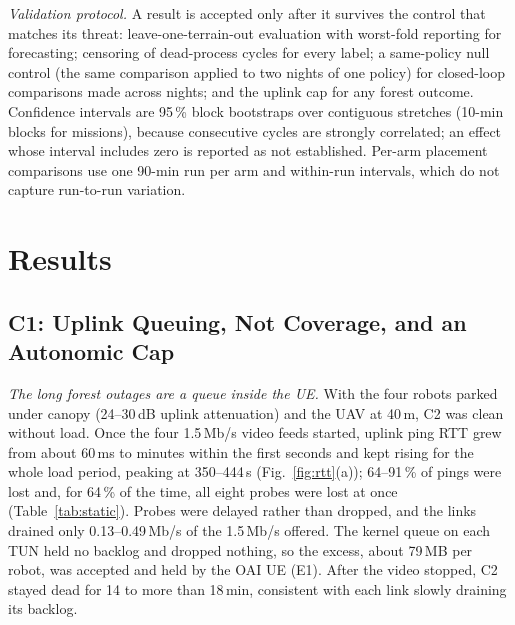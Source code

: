 \begin{table}[t]
\caption{Placement Arms}
\label{tab:arms}
\centering
\small

\end{table}

\textit{Validation protocol.} A result is accepted only after it survives the
control that matches its threat: leave-one-terrain-out evaluation with
worst-fold reporting for forecasting; censoring of dead-process cycles for every
label; a same-policy null control (the same comparison applied to two nights of
one policy) for closed-loop comparisons made across nights; and the uplink cap
for any forest outcome. Confidence intervals are 95\,\% block bootstraps over
contiguous stretches (10-min blocks for missions), because consecutive cycles
are strongly correlated; an effect whose interval includes zero is reported as
not established. Per-arm placement comparisons use one 90-min run per arm and
within-run intervals, which do not capture run-to-run variation.
\section{Results}
\label{sec:results}

\subsection{C1: Uplink Queuing, Not Coverage, and an Autonomic Cap}
\label{sec:r-cap}

\textit{The long forest outages are a queue inside the UE.} With the four
robots parked under canopy (24--30\,dB uplink attenuation) and the UAV at
40\,m, C2 was clean without load. Once the four 1.5\,Mb/s video feeds started,
uplink ping RTT grew from about 60\,ms to minutes within the first seconds and
kept rising for the whole load period, peaking at 350--444\,s
(Fig.~\ref{fig:rtt}(a)); 64--91\,\% of pings were lost and, for 64\,\% of the
time, all eight probes were lost at once (Table~\ref{tab:static}). Probes were
delayed rather than dropped, and the links drained only 0.13--0.49\,Mb/s of the
1.5\,Mb/s offered. The kernel queue on each TUN held no backlog and dropped
nothing, so the excess, about 79\,MB per robot, was accepted and held by the OAI
UE (E1). After the video stopped, C2 stayed dead for 14 to more than 18\,min,
consistent with each link slowly draining its backlog.

